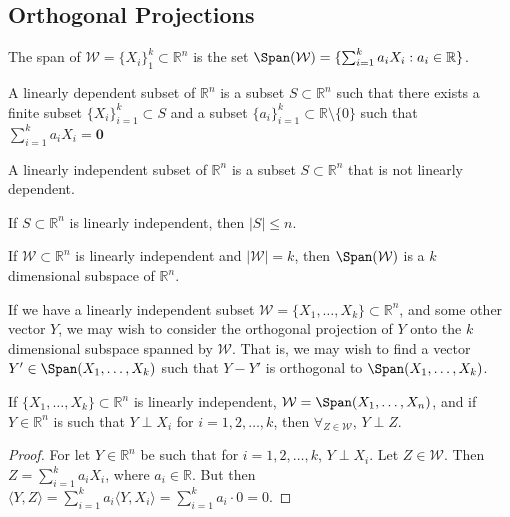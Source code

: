 \documentclass[crop=false,class=book,oneside]{standalone}
\begin{document}
\subsection{Orthogonal Projections}
\begin{definition}
The span of $\mathcal{W}=\{X_{i}\}_{1}^{k} \subset \mathbb{R}^n$ is the set $\Span(\mathcal{W})=\{\sum_{i=1}^{k} a_i X_i: a_i \in \mathbb{R}\}$.
\end{definition}
\begin{definition}
A linearly dependent subset of $\mathbb{R}^{n}$ is a subset $S\subset\mathbb{R}^{n}$ such that there exists a finite subset $\{X_{i}\}_{i=1}^{k}\subset S$ and a subset $\{a_{i}\}_{i=1}^{k}\subset \mathbb{R}\setminus \{0\}$ such that $\sum_{i=1}^{k}a_{i}X_{i}=\mathbf{0}$
\end{definition}
\begin{definition}
A linearly independent subset of $\mathbb{R}^{n}$ is a subset $S\subset \mathbb{R}^{n}$ that is not linearly dependent.
\end{definition}
\begin{theorem}
If $S\subset\mathbb{R}^{n}$ is linearly independent, then $|S|\leq n$.
\end{theorem}
\begin{theorem}
If $\mathcal{W}\subset\mathbb{R}^{n}$ is linearly independent and $|\mathcal{W}| = k$, then $\Span(\mathcal{W})$ is a $k$ dimensional subspace of $\mathbb{R}^n$.
\end{theorem}
If we have a linearly independent subset $\mathcal{W}=\{X_1,\hdots, X_k\}\subset\mathbb{R}^n$, and some other vector $Y$, we may wish to consider the orthogonal projection of $Y$ onto the $k$ dimensional subspace spanned by $\mathcal{W}$. That is, we may wish to find a vector $Y'\in\Span(X_1,\hdots, X_k)$ such that $Y-Y'$ is orthogonal to $\Span(X_1,\hdots, X_k)$.
\begin{theorem}
If $\{X_1,\hdots, X_k\}\subset\mathbb{R}^n$ is linearly independent, $\mathcal{W} = \Span(X_1,\hdots, X_n)$, and if $Y\in \mathbb{R}^n$ is such that $Y\perp X_i$ for $i=1,2,\hdots, k$, then $\forall_{Z\in \mathcal{W}}$, $Y\perp Z$.
\end{theorem}
\begin{proof}
For let $Y\in \mathbb{R}^n$ be such that for $i=1,2,\hdots, k$, $Y\perp X_i$. Let $Z\in \mathcal{W}$. Then $Z= \sum_{i=1}^{k} a_i X_i$, where $a_i\in \mathbb{R}$. But then $\langle Y, Z\rangle = \sum_{i=1}^{k} a_i \langle Y, X_i\rangle = \sum_{i=1}^{k} a_i\cdot 0 = 0$. 
\end{proof}
\end{document}
